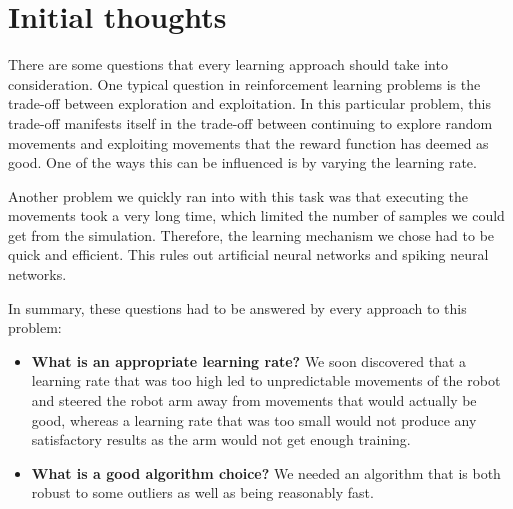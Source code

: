 \section{Initial thoughts} \label{sec:motivation}

There are some questions that every learning approach should take into consideration. One typical question in reinforcement learning problems is the trade-off between exploration and exploitation. In this particular problem, this trade-off manifests itself in the trade-off between continuing to explore random movements and exploiting movements that the reward function has deemed as good. One of the ways this can be influenced is by varying the learning rate.

Another problem we quickly ran into with this task was that executing the movements took a very long time, which limited the number of samples we could get from the simulation. Therefore, the learning mechanism we chose had to be quick and efficient. This rules out artificial neural networks and spiking neural networks.

In summary, these questions had to be answered by every approach to this problem:

\begin{itemize}
	\item \textbf{What is an appropriate learning rate?} We soon discovered that a learning rate that was too high led to unpredictable movements of the robot and steered the robot arm away from movements that would actually be good, whereas a learning rate that was too small would not produce any satisfactory results as the arm would not get enough training.
	\item \textbf{What is a good algorithm choice?} We needed an algorithm that is both robust to some outliers as well as being reasonably fast.
\end{itemize}
